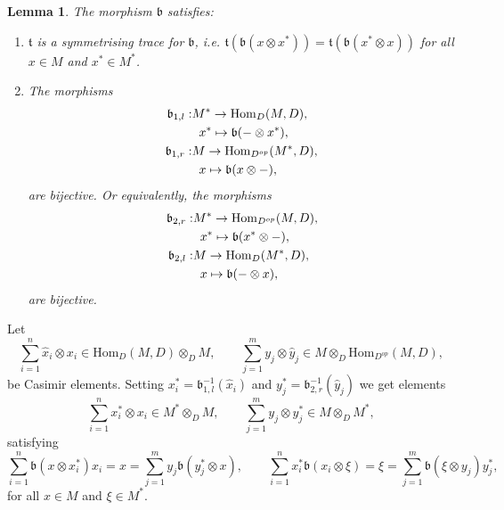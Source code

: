 \documentclass[a4paper, reqno]{amsart}
\newtheorem{mylemma}[mythm]{Lemma}
\theoremstyle{definition}
\renewcommand{\t}{\mathfrak{t}}
\renewcommand{\b}{\mathfrak{b}}
\begin{document}
\begin{mylemma}\cite[Lemma 3.9]{soderberg2024mutation}
	The morphism $\mathfrak{b}$ satisfies:
	\begin{enumerate}
		\item $\t$ is a symmetrising trace for $\b$, i.e. $\t(\mathfrak{b}(x\otimes x^*)) = \t(\b(x^*\otimes x))$ for all $x\in M$ and $x^*\in M^*$.
		\item The morphisms
		\begin{equation*}
			\begin{aligned}
				\b_{1, l}:& M^* \to \mathrm{Hom}_D(M, D), \\
				&\hspace*{0.2cm}x^*\mapsto \b(-\otimes x^*), \\
				\b_{1, r}:& M \to \mathrm{Hom}_{D^{op}}(M^*, D), \\
				&\hspace*{0.2cm}x \mapsto \b(x\otimes -),
			\end{aligned}
		\end{equation*}
		are bijective. Or equivalently, the morphisms
		\begin{equation*}
			\begin{aligned}
				\b_{2, r}:& M^* \to \mathrm{Hom}_{D^{op}}(M, D), \\
				&\hspace*{0.2cm}x^*\mapsto \b(x^*\otimes -), \\
				\b_{2, l}:& M \to \mathrm{Hom}_D(M^*, D), \\
				&\hspace*{0.2cm}x \mapsto \b(-\otimes x),
			\end{aligned}
		\end{equation*}
		are bijective.
	\end{enumerate}
\end{mylemma}

Let
\begin{equation*}
	\sum_{i=1}^n \hat{x}_i\otimes x_i\in \mathrm{Hom}_D(M, D)\otimes_D M, \qquad \sum_{j=1}^m y_j\otimes \hat{y}_j\in M\otimes_D \mathrm{Hom}_{D^{op}}(M, D),
\end{equation*}
be Casimir elements. Setting $x^*_i = \b_{1, l}^{-1}(\hat{x}_i)$ and $y^*_j = \b_{2, r}^{-1}(\hat{y}_j)$ we get elements
\begin{equation}\label{eq - Casimir elements of M M^*}
	\sum_{i=1}^n x_i^*\otimes x_i\in M^*\otimes_D M, \qquad \sum_{j=1}^m y_j\otimes y_j^*\in M\otimes_D M^*,
\end{equation}
satisfying
\begin{equation}\label{eq - casimir elements equations ass. to b}
	\sum_{i=1}^n \b(x\otimes x_i^*)x_i = x = \sum_{j=1}^my_j\b(y_j^*\otimes x), \qquad \sum_{i=1}^n x_i^*\b(x_i\otimes \xi) = \xi = \sum_{j=1}^m\b(\xi\otimes y_j)y_j^*,
\end{equation}
for all $x\in M$ and $\xi\in M^*$.
\end{document}
